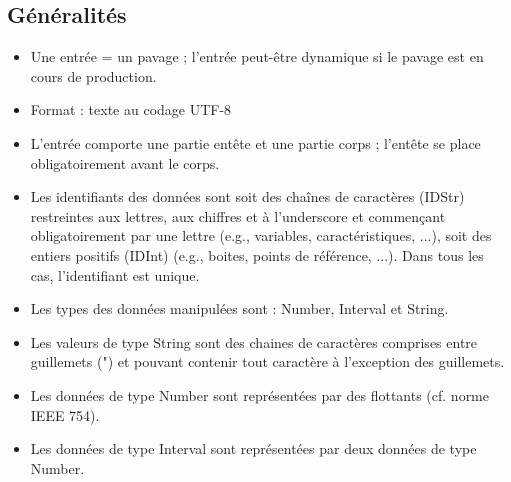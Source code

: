 \documentclass[a4paper]{article}
\begin{document}
\subsection{Généralités}
\begin{itemize}
\item Une entrée = un pavage ; l'entrée peut-être dynamique si le pavage est en cours de production.
\item Format : texte au codage UTF-8
\item L'entrée comporte une partie entête et une partie corps ; l'entête se place obligatoirement avant le corps.
\item Les identifiants des données sont soit des chaînes de caractères (IDStr) restreintes aux lettres, aux chiffres et à l'underscore et commençant obligatoirement par une lettre (e.g., variables, caractéristiques, ...), soit des entiers positifs (IDInt) (e.g., boites, points de référence, ...). Dans tous les cas, l'identifiant est unique.
\item Les types des données manipulées sont : Number, Interval et String.
\item Les valeurs de type String sont des chaines de caractères comprises entre guillemets (") et pouvant contenir tout caractère à l'exception des guillemets.
\item Les données de type Number sont représentées par des flottants (cf. norme IEEE 754).
\item Les données de type Interval sont représentées par deux données de type Number.
\end{itemize}

\end{document}
